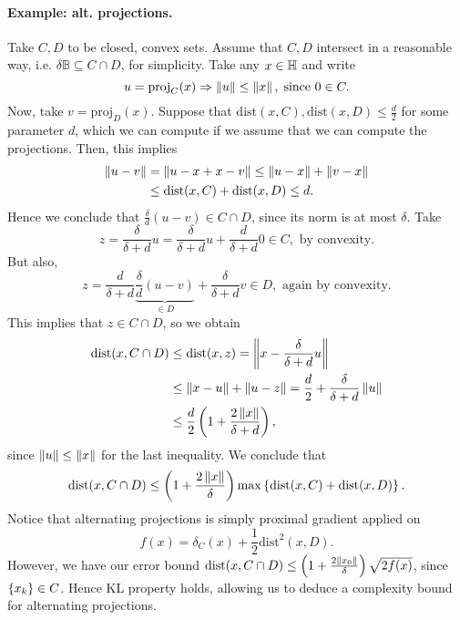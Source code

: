 \paragraph{Example: alt. projections.} Take $C, D$ to be closed, convex sets.
Assume that $C, D$ intersect in a reasonable way, i.e. $\delta \mathbb{B}
\subseteq C \cap D$, for simplicity. Take any $x \in \mathbb{H}$ and write
\[
	u = \mathrm{proj}_C(x) \Rightarrow \left \| u \right \| \leq \left \| x \right \|, \;
	\text{since } 0 \in C.
\]
Now, take $v = \mathrm{proj}_D(x)$. Suppose that $\mathrm{dist}(x, C),
\mathrm{dist}(x, D) \leq \frac{d}{2}$ for some parameter $d$, which we can
compute if we assume that we can compute the projections. Then, this implies
\begin{align*}
	\left \| u - v \right \| &= \left \| u - x + x - v \right \| \leq \left \| u - x \right \| + \left \| v - x \right \| \\
		&\leq \mathrm{dist}(x, C) + \mathrm{dist}(x, D) \leq d.
\end{align*}
Hence we conclude that $\frac{\delta}{d} (u - v) \in C \cap D$, since its norm
is at most $\delta$. Take
\[
	z = \frac{\delta}{\delta + d} u = \frac{\delta}{\delta + d} u +
	\frac{d}{\delta + d} 0 \in C, \text{ by convexity.}
\]
But also,
\[
	z = \frac{d}{\delta + d} \underbrace{\frac{\delta}{d} (u - v)}_{\in D}
	+ \frac{\delta}{\delta + d} v \in D, \text{ again by convexity.}
\]
This implies that $z \in C \cap D$, so we obtain
\begin{align*}
	\mathrm{dist}(x, C \cap D) &\leq \mathrm{dist}(x, z) =
		\left \| x - \frac{\delta}{\delta + d} u \right \| \\
		&\leq \left \| x - u \right \| + \left \| u - z \right \| = \frac{d}{2}
			+ \frac{\delta}{\delta + d} \left \| u \right \| \\
		&\leq \frac{d}{2} \left(1 + \frac{2\left \| x \right \|}{\delta + d}\right),
\end{align*}
since $\left \| u \right \| \leq \left \| x \right \|$ for the last inequality. We conclude that
\[
	\mathrm{dist}(x, C \cap D) \leq \left( 1 + \frac{2\left \| x \right \|}{\delta}\right)
	\max\left\{ \mathrm{dist}(x, C) + \mathrm{dist}(x, D) \right\}.
\]
Notice that alternating projections is simply proximal gradient applied on
\[
	f(x) = \delta_C(x) + \frac{1}{2} \mathrm{dist}^2(x, D).
\]
However, we have our error bound $\mathrm{dist}(x, C \cap D)
\leq \left(1 + \frac{2\left \| x_0 \right \|}{\delta} \right) \sqrt{2 f(x)}$, since
$\left\{ x_k \right\} \in C$. Hence KL property holds, allowing us to deduce a complexity
bound for alternating projections.
